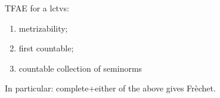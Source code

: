 \documentclass[12pt, reqno,a4paper, twoside]{amsproc}
\newcommand{\dbQ}{\mathbb Q}
\newcommand{\set}[1]{\left\{{#1}\right\}}
\newenvironment{sol}{\sc Solution. \rm}{\hfill \qedsymbol\bigskip}
\begin{document}
\begin{exer}
	TFAE for a lctvs:
	\begin{enumerate}
		\item metrizability;\item  first countable; \item countable collection of seminorms
	\end{enumerate}
In particular: complete+either of the above gives Fr\`echet.
\end{exer}
%
%	
%	
%	
\end{document}

